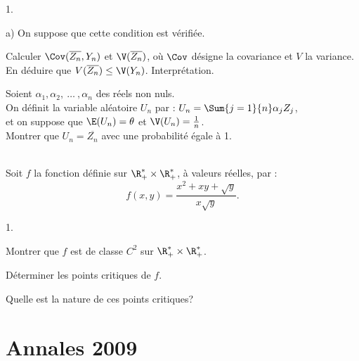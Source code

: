\documentclass[11pt]{article}%
\begin{document}
\begin{exerciceAP}
\begin{noliste}{1.}
\begin{noliste}{a)}
      On suppose que cette condition est vérifiée. \\
    \item Calculer $\Cov ( \overline{Z_n} , Y_n )$ et $\V(
      \overline{Z_n} )$, où $\Cov$ désigne la covariance et $V$ la
      variance. \\
      En déduire que $V (\overline{Z_n} ) \leq
      \V(Y_n)$. Interprétation.
    \end{noliste}
  \item Soient $\alpha_1, \alpha_2,\ \dots\ , \alpha_n$ des réels non
    nuls.\\
    On définit la variable aléatoire $U_n$ par : $U_n = \Sum{j=1}{n}
    \alpha_j Z_j$,\\
    et on suppose que $\E(U_n) = \theta$ et $\V(U_n) = \frac{1}{n}$. \\
    Montrer que $U_n = \overline{Z_n}$ avec une probabilité égale à 1. 
  \end{noliste}
\end{exerciceAP}


\begin{exerciceSP}~\\
  Soit $f$ la fonction définie sur $\R_+^* \times \R_+^*$, à valeurs
  réelles, par :
  \[
  f(x,y) = \frac{x^2 + xy + \sqrt{y} }{x \sqrt{y} }. 
  \]
  \begin{noliste}{1.}
    \setlength{\itemsep}{2mm}
  \item Montrer que $f$ est de classe $C^2$ sur $\R_+^* \times \R_+^*$.
  \item Déterminer les points critiques de $f$. 
  \item Quelle est la nature de ces points critiques?
  \end{noliste}
\end{exerciceSP}


\newpage


\section{Annales 2009}

\end{document}
